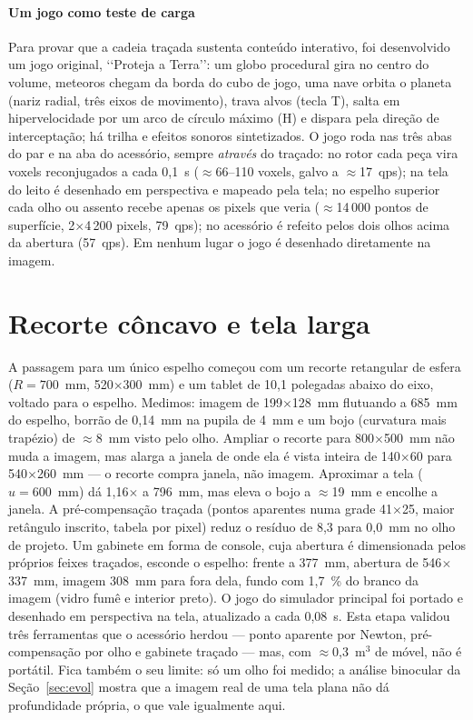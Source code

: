 \documentclass[journal,10pt]{IEEEtran}
\begin{document}
\paragraph{Um jogo como teste de carga} Para provar que a cadeia tra\c{c}ada sustenta conte\'udo interativo, foi desenvolvido um jogo original, \lq\lq Proteja a Terra\rq\rq: um globo procedural gira no centro do volume, meteoros chegam da borda do cubo de jogo, uma nave orbita o planeta (nariz radial, tr\^es eixos de movimento), trava alvos (tecla T), salta em hipervelocidade por um arco de c\'irculo m\'aximo (H) e dispara pela dire\c{c}\~ao de intercepta\c{c}\~ao; h\'a trilha e efeitos sonoros sintetizados. O jogo roda nas tr\^es abas do par e na aba do acess\'orio, sempre \emph{atrav\'es} do tra\c{c}ado: no rotor cada pe\c{c}a vira voxels reconjugados a cada 0,1~s ($\approx$66--110 voxels, galvo a $\approx$17~qps); na tela do leito \'e desenhado em perspectiva e mapeado pela tela; no espelho superior cada olho ou assento recebe apenas os pixels que veria ($\approx$14\,000 pontos de superf\'icie, 2$\times$4\,200 pixels, 79~qps); no acess\'orio \'e refeito pelos dois olhos acima da abertura (57~qps). Em nenhum lugar o jogo \'e desenhado diretamente na imagem.

\section{Recorte c\^oncavo e tela larga}
\label{sec:recorte}
A passagem para um \'unico espelho come\c{c}ou com um recorte retangular de esfera ($R = 700$~mm, 520$\times$300~mm) e um tablet de 10,1 polegadas abaixo do eixo, voltado para o espelho. Medimos: imagem de 199$\times$128~mm flutuando a 685~mm do espelho, borr\~ao de 0,14~mm na pupila de 4~mm e um bojo (curvatura mais trap\'ezio) de $\approx$8~mm visto pelo olho. Ampliar o recorte para 800$\times$500~mm n\~ao muda a imagem, mas alarga a janela de onde ela \'e vista inteira de 140$\times$60 para 540$\times$260~mm --- o recorte compra janela, n\~ao imagem. Aproximar a tela ($u = 600$~mm) d\'a 1,16$\times$ a 796~mm, mas eleva o bojo a $\approx$19~mm e encolhe a janela. A pr\'e-compensa\c{c}\~ao tra\c{c}ada (pontos aparentes numa grade 41$\times$25, maior ret\^angulo inscrito, tabela por pixel) reduz o res\'iduo de 8,3 para 0,0~mm no olho de projeto. Um gabinete em forma de console, cuja abertura \'e dimensionada pelos pr\'oprios feixes tra\c{c}ados, esconde o espelho: frente a 377~mm, abertura de 546$\times$337~mm, imagem 308~mm para fora dela, fundo com 1,7~\% do branco da imagem (vidro fum\^e e interior preto). O jogo do simulador principal foi portado e desenhado em perspectiva na tela, atualizado a cada 0,08~s. Esta etapa validou tr\^es ferramentas que o acess\'orio herdou --- ponto aparente por Newton, pr\'e-compensa\c{c}\~ao por olho e gabinete tra\c{c}ado --- mas, com $\approx$0,3~m$^3$ de m\'ovel, n\~ao \'e port\'atil. Fica tamb\'em o seu limite: s\'o um olho foi medido; a an\'alise binocular da Se\c{c}\~ao~\ref{sec:evol} mostra que a imagem real de uma tela plana n\~ao d\'a profundidade pr\'opria, o que vale igualmente aqui.
\end{document}
